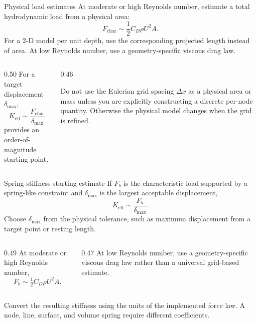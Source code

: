 \documentclass[aspectratio=169,11pt]{beamer}
\begin{document}
\begin{frame}{Physical load estimates}
At moderate or high Reynolds number, estimate a total hydrodynamic load from a physical area:
\[
  F_{\mathrm{char}}\sim\frac12 C_D\rho U^2A.
\]
For a 2-D model per unit depth, use the corresponding projected length instead of area. At low Reynolds number, use a geometry-specific viscous drag law.

\begin{columns}[T,onlytextwidth]
\begin{column}{0.50\textwidth}
For a target displacement $\delta_{\max}$,
\[
  K_{\mathrm{eff}}\sim\frac{F_{\mathrm{char}}}{\delta_{\max}}
\]
provides an order-of-magnitude starting point.
\end{column}
\begin{column}{0.46\textwidth}
\begin{punchbox}
\small
Do not use the Eulerian grid spacing $\Delta x$ as a physical area or mass unless you are explicitly constructing a discrete per-node quantity. Otherwise the physical model changes when the grid is refined.
\end{punchbox}
\end{column}
\end{columns}
\end{frame}

\begin{frame}{Spring-stiffness starting estimate}
If $F_b$ is the characteristic load supported by a spring-like constraint and $\delta_{\max}$ is the largest acceptable displacement,
\[
  \boxed{K_{\mathrm{eff}}\sim\frac{F_b}{\delta_{\max}}}.
\]
Choose $\delta_{\max}$ from the physical tolerance, such as maximum displacement from a target point or resting length.

\begin{columns}[T,onlytextwidth]
\begin{column}{0.49\textwidth}
At moderate or high Reynolds number,
\[
  F_b\sim\tfrac12 C_D\rho U^2A.
\]
\end{column}
\begin{column}{0.47\textwidth}
At low Reynolds number, use a geometry-specific viscous drag law rather than a universal grid-based estimate.
\end{column}
\end{columns}
\begin{punchbox}
\small Convert the resulting stiffness using the units of the implemented force law. A node, line, surface, and volume spring require different coefficients.
\end{punchbox}
\end{frame}
\end{document}
